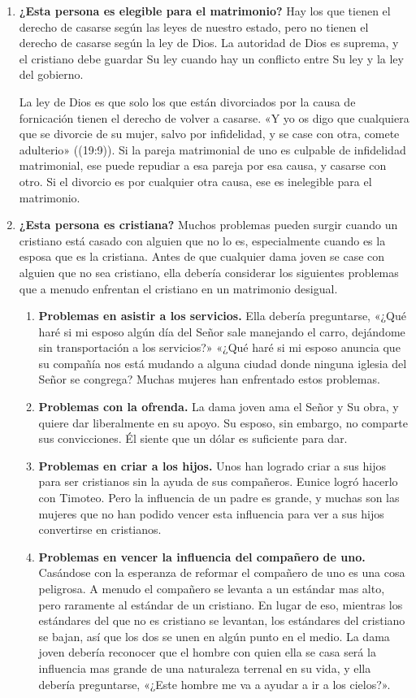 \documentclass[12pt, twoside, openright]{book}
\begin{document}
\begin{enumerate}
\item \textbf{¿Esta persona es elegible para el matrimonio?} Hay los que tienen el derecho de casarse según las leyes de nuestro estado, pero no tienen el derecho de casarse según la ley de Dios. La autoridad de Dios es suprema, y el cristiano debe guardar Su ley cuando hay un conflicto entre Su ley y la ley del gobierno.

La ley de Dios es que solo los que están divorciados por la causa de fornicación tienen el derecho de volver a casarse. «Y yo os digo que cualquiera que se divorcie de su mujer, salvo por infidelidad, y se case con otra, comete adulterio» ((19:9)). Si la pareja matrimonial de uno es culpable de infidelidad matrimonial, ese puede repudiar a esa pareja por esa causa, y casarse con otro. Si el divorcio es por cualquier otra causa, ese es inelegible para el matrimonio. 
\item \textbf{¿Esta persona es cristiana?} Muchos problemas pueden surgir cuando un cristiano está casado con alguien que no lo es, especialmente cuando es la esposa que es la cristiana. Antes de que cualquier dama joven se case con alguien que no sea cristiano, ella debería considerar los siguientes problemas que a menudo enfrentan el cristiano en un matrimonio desigual.
	\begin{enumerate}
	\item \textbf{Problemas en asistir a los servicios.} Ella debería preguntarse, «¿Qué haré si mi esposo algún día del Señor sale manejando el carro, dejándome sin transportación a los servicios?» «¿Qué haré si mi esposo anuncia que su compañía nos está mudando a 					alguna ciudad donde ninguna iglesia del Señor se congrega? Muchas mujeres han enfrentado estos problemas.
	\item \textbf{Problemas con la ofrenda.} La dama joven ama el Señor y Su obra, y quiere dar liberalmente en su apoyo. Su esposo, sin embargo, no comparte sus convicciones. Él siente que un dólar es suficiente para dar.
	\item \textbf{Problemas en criar a los hijos.} Unos han logrado criar a sus hijos para ser cristianos sin la ayuda de sus compañeros. Eunice logró hacerlo con Timoteo. Pero la influencia de un padre es grande, y muchas son las mujeres que no han podido vencer esta 					influencia para ver a sus hijos convertirse en cristianos.
	\item \textbf{Problemas en vencer la influencia del compañero de uno.} Casándose con la esperanza de reformar el compañero de uno es una cosa peligrosa. A menudo el compañero se levanta a un estándar mas alto, pero raramente al estándar de un cristiano. En 					lugar de eso, mientras los estándares del que no es cristiano se levantan, los estándares del cristiano se bajan, así que los dos se unen en algún punto en el medio. La dama joven debería reconocer que el hombre con quien ella se casa será la influencia 					mas grande de una 	naturaleza terrenal en su vida, y ella debería preguntarse, «¿Este hombre me va a ayudar a ir a los cielos?».

\end{enumerate}
\end{enumerate}
\end{document}
